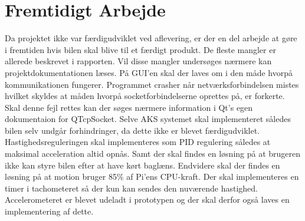 \chapter{Fremtidigt Arbejde} \label{ch:Fremtidigt_arbejde}

Da projektet ikke var færdigudviklet ved aflevering, er der en del arbejde at gøre i fremtiden hvis bilen skal blive til et færdigt produkt. 
De fleste mangler er allerede beskrevet i rapporten. Vil disse mangler undersøges nærmere kan projektdokumentationen læses. 
På GUI'en skal der laves om i den måde hvorpå kommunikationen fungerer. 
Programmet crasher når netværksforbindelsen mistes hvilket skyldes at måden hvorpå socketforbindelserne oprettes på, er forkerte. 
Skal denne fejl rettes kan der søges nærmere information i Qt's egen dokumentaion for QTcpSocket\cite{lib:qtcpsocket}. 
Selve AKS systemet skal implementeret således bilen selv undgår forhindringer, da dette ikke er blevet færdigudviklet.
Hastighedsreguleringen skal implementeres som PID regulering således at maksimal acceleration altid opnås. 
Samt der skal findes en løsning på at brugeren ikke kan styre bilen efter at have kørt baglæns. 
Endvidere skal der findes en løsning på at motion bruger 85\% af Pi'ens CPU-kraft. 
Der skal implementeres en timer i tachometeret så der kun kan sendes den nuværende hastighed. 
Accelerometeret er blevet udeladt i prototypen og der skal derfor også laves en implementering af dette.